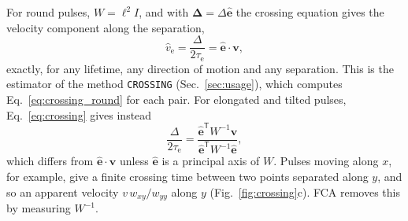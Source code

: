 \documentclass[aps,pre,11pt,a4paper,preprint,amsmath,amssymb,groupedaddress]{revtex4-2}
\newcommand{\Eqref}[1]{Eq.~\eqref{#1}}
\newcommand{\Figref}[1]{Fig.~\ref{#1}}
\newcommand{\Secref}[1]{Sec.~\ref{#1}}
\newcommand{\wh}{\widehat}
\newcommand{\bv}{\ensuremath{\bm{v}}}
\newcommand{\bD}{\ensuremath{\bm{\Delta}}}
\newcommand{\be}{\ensuremath{\hat{\bm{e}}}}
\newcommand{\T}{\ensuremath{\mathsf{T}}}
\newcommand{\taue}{\ensuremath{\tau_\text{e}}}
\newcommand{\Wi}{\ensuremath{W^{-1}}}
\newcommand{\w}[1]{\ensuremath{w_{#1}}}
\newcommand{\code}[1]{\texttt{#1}}
\begin{document}
For round pulses, $W = \ell^2 I$, and with $\bD = \Delta\be$ the crossing equation gives the velocity component along the separation,
%
\begin{equation}
\label{eq:crossing_round}
\wh{v}_\text{e} = \frac{\Delta}{2\taue} = \be\cdot\bv,
\end{equation}
%
exactly, for any lifetime, any direction of motion and any separation. This is the estimator of the method \code{CROSSING} (\Secref{sec:usage}), which computes \Eqref{eq:crossing_round} for each pair. For elongated and tilted pulses, \Eqref{eq:crossing} gives instead
%
\begin{equation}
\label{eq:crossing_barber}
\frac{\Delta}{2\taue} = \frac{\be^\T\Wi\bv}{\be^\T\Wi\be},
\end{equation}
%
which differs from $\be\cdot\bv$ unless \be{} is a principal axis of $W$. Pulses moving along $x$, for example, give a finite crossing time between two points separated along $y$, and so an apparent velocity $v\,\w{xy}/\w{yy}$ along $y$ (\Figref{fig:crossing}c). FCA removes this by measuring \Wi.
\end{document}

